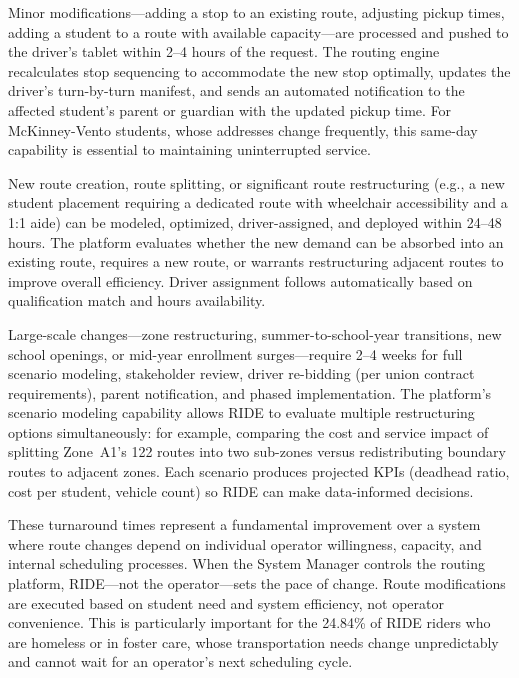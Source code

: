\begin{description}[style=nextline, leftmargin=0.5cm]
    \item[\faIcon{bolt} \textbf{Same-Day Changes:}] Minor modifications---adding a stop to an existing route, adjusting pickup times, adding a student to a route with available capacity---are processed and pushed to the driver's tablet within 2--4 hours of the request. The routing engine recalculates stop sequencing to accommodate the new stop optimally, updates the driver's turn-by-turn manifest, and sends an automated notification to the affected student's parent or guardian with the updated pickup time. For McKinney-Vento students, whose addresses change frequently, this same-day capability is essential to maintaining uninterrupted service.

    \item[\faIcon{calendar-day} \textbf{24--48 Hour Changes:}] New route creation, route splitting, or significant route restructuring (e.g., a new student placement requiring a dedicated route with wheelchair accessibility and a 1:1 aide) can be modeled, optimized, driver-assigned, and deployed within 24--48 hours. The platform evaluates whether the new demand can be absorbed into an existing route, requires a new route, or warrants restructuring adjacent routes to improve overall efficiency. Driver assignment follows automatically based on qualification match and hours availability.

    \item[\faIcon{calendar-week} \textbf{Seasonal / Systemic Changes:}] Large-scale changes---zone restructuring, summer-to-school-year transitions, new school openings, or mid-year enrollment surges---require 2--4 weeks for full scenario modeling, stakeholder review, driver re-bidding (per union contract requirements), parent notification, and phased implementation. The platform's scenario modeling capability allows RIDE to evaluate multiple restructuring options simultaneously: for example, comparing the cost and service impact of splitting Zone~A1's 122 routes into two sub-zones versus redistributing boundary routes to adjacent zones. Each scenario produces projected KPIs (deadhead ratio, cost per student, vehicle count) so RIDE can make data-informed decisions.
\end{description}

These turnaround times represent a fundamental improvement over a system where route changes depend on individual operator willingness, capacity, and internal scheduling processes. When the System Manager controls the routing platform, RIDE---not the operator---sets the pace of change. Route modifications are executed based on student need and system efficiency, not operator convenience. This is particularly important for the 24.84\% of RIDE riders who are homeless or in foster care, whose transportation needs change unpredictably and cannot wait for an operator's next scheduling cycle.
